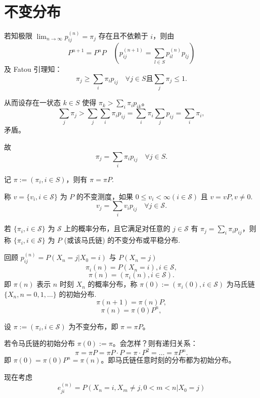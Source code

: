 \documentclass[lang=cn,10pt,thmcnt=section]{elegantbook}
\begin{document}
\section{不变分布}
若知极限 $\lim_{n \to \infty} p_{ij}^{(n)} = \pi_j$ 存在且不依赖于 $i$，则由
\[
P^{n+1} = P^n P \quad (p_{ij}^{(n+1)} = \sum_{l \in S} p_{il}^{(n)} p_{lj})
\]
及 Fatou 引理知：
\[
\pi_j \geq \sum_i \pi_i p_{ij} \quad \forall j \in S \text{且} \sum_j \pi_j \leq 1.
\]

从而设存在一状态 $k \in S$ 使得 $\pi_k > \sum_i \pi_i p_{ik}$。
\[
\sum_j \pi_j > \sum_j \sum_i \pi_i p_{ij} = \sum_i \pi_i \sum_j p_{ij} = \sum_i \pi_i,
\]
矛盾。

故
\[
\pi_j = \sum_i \pi_i p_{ij} \quad \forall j \in S.
\]

记 $\pi := (\pi_i, i \in S)$，则有 $\pi = \pi P$.

\begin{definition}
	称 $v = \{v_i, i \in \mathcal{S}\}$ 为 $P$ 的不变测度，如果 $0 \leq v_i < \infty (i \in \mathcal{S})$ 且 $v = vP, v \neq 0$.
\[
v_j = \sum_i v_i p_{ij} \quad \forall j \in \mathcal{S}.
\]
\end{definition}
\begin{definition}[不变分布]
	若 $\{\pi_i, i \in \mathcal{S}\}$ 为 $\mathcal{S}$ 上的概率分布，且它满足对任意的 $j \in \mathcal{S}$ 有 $\pi_j = \sum_i \pi_i p_{ij}$，则称 $\{\pi_i, i \in \mathcal{S}\}$ 为 $P$ (或该马氏链) 的不变分布或平稳分布.
\end{definition}

回顾 $p_{ij}^{(n)} = P(X_n = j | X_0 = i)$ 与 $P(X_n = j)$
\[
\pi_i(n) = P(X_n = i), i \in \mathcal{S},
\]
\[
\pi(n) = (\pi_i(n), i \in \mathcal{S}).
\]
即 $\pi(n)$ 表示 $n$ 时刻 $X_n$ 的概率分布，称 $\pi(0) := (\pi_i(0), i \in \mathcal{S})$ 为马氏链 $\{X_n, n = 0, 1, \ldots\}$ 的初始分布.
\[
\pi(n+1) = \pi(n)P,
\]
\[
\pi(n) = \pi(0)P^n,
\]

设 $\pi := (\pi_i, i \in \mathcal{S})$ 为不变分布，即 $\pi = \pi P$。

若令马氏链的初始分布 $\pi(0) := \pi$。会怎样？则有递归关系：
\[
\pi = \pi P = \pi P \cdot P = \pi \cdot P^2 = \ldots = \pi P^n.
\]
即 $\pi(0) = \pi(0) P^n = \pi(n)$。即马氏链任意时刻的分布都为初始分布。

现在考虑
\begin{equation*}
	e_{ji}^{(n)} = P(X_n = i, X_m \neq j, 0 < m < n | X_0 = j) \tag{5.2}
\end{equation*}
	
\end{document}
